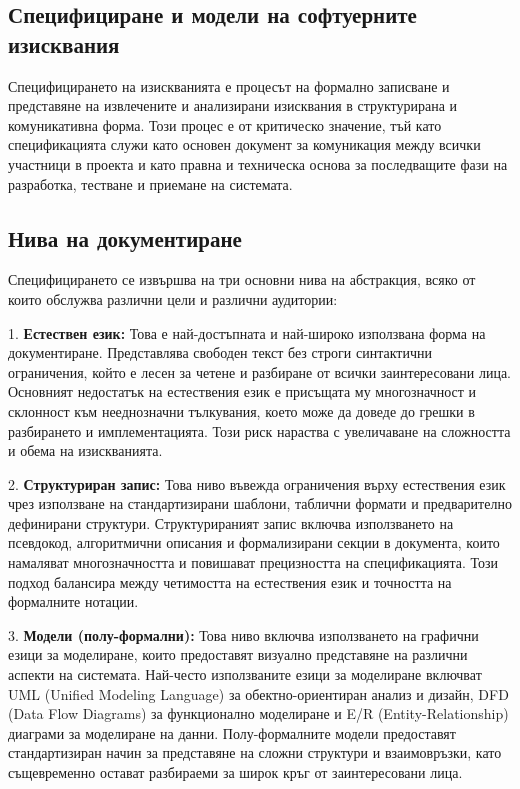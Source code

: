 \documentclass{scrartcl}
\begin{document}
\begin{FlushLeft}
\section{Специфициране и модели на софтуерните изисквания}

Специфицирането на изискванията е процесът на формално записване и представяне на извлечените и анализирани изисквания в структурирана и комуникативна форма. Този процес е от критическо значение, тъй като спецификацията служи като основен документ за комуникация между всички участници в проекта и като правна и техническа основа за последващите фази на разработка, тестване и приемане на системата.

\subsection{Нива на документиране}

Специфицирането се извършва на три основни нива на абстракция, всяко от които обслужва различни цели и различни аудитории:

1. \textbf{Естествен език:} Това е най-достъпната и най-широко използвана форма на документиране. Представлява свободен текст без строги синтактични ограничения, който е лесен за четене и разбиране от всички заинтересовани лица. Основният недостатък на естествения език е присъщата му многозначност и склонност към нееднозначни тълкувания, което може да доведе до грешки в разбирането и имплементацията. Този риск нараства с увеличаване на сложността и обема на изискванията.

2. \textbf{Структуриран запис:} Това ниво въвежда ограничения върху естествения език чрез използване на стандартизирани шаблони, таблични формати и предварително дефинирани структури. Структурираният запис включва използването на псевдокод, алгоритмични описания и формализирани секции в документа, които намаляват многозначността и повишават прецизността на спецификацията. Този подход балансира между четимостта на естествения език и точността на формалните нотации.

3. \textbf{Модели (полу-формални):} Това ниво включва използването на графични езици за моделиране, които предоставят визуално представяне на различни аспекти на системата. Най-често използваните езици за моделиране включват UML (Unified Modeling Language) за обектно-ориентиран анализ и дизайн, DFD (Data Flow Diagrams) за функционално моделиране и E/R (Entity-Relationship) диаграми за моделиране на данни. Полу-формалните модели предоставят стандартизиран начин за представяне на сложни структури и взаимовръзки, като същевременно остават разбираеми за широк кръг от заинтересовани лица.


\end{FlushLeft}
\end{document}

